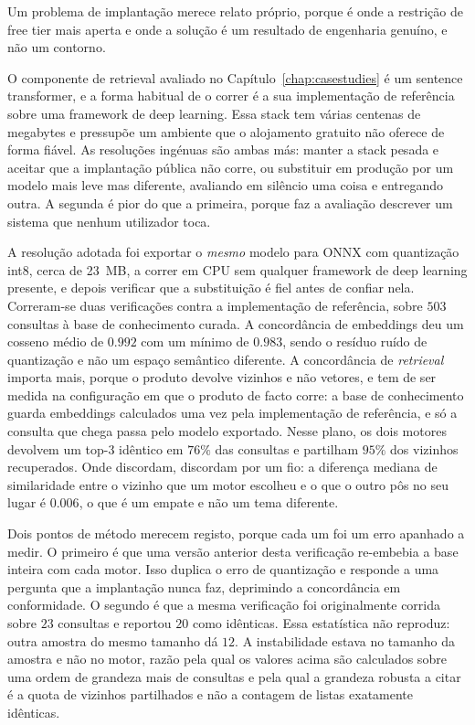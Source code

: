 Um problema de implantação merece relato próprio, porque é onde a restrição de free tier mais aperta e
onde a solução é um resultado de engenharia genuíno, e não um contorno.

O componente de retrieval avaliado no Capítulo~\ref{chap:casestudies} é um sentence transformer, e a
forma habitual de o correr é a sua implementação de referência sobre uma framework de deep learning. Essa stack tem
várias centenas de megabytes e pressupõe um ambiente que o alojamento gratuito não oferece de forma
fiável. As resoluções ingénuas são ambas más: manter a stack pesada e aceitar que a implantação pública
não corre, ou substituir em produção por um modelo mais leve mas diferente, avaliando em silêncio uma
coisa e entregando outra. A segunda é pior do que a primeira, porque faz a avaliação descrever um
sistema que nenhum utilizador toca.

A resolução adotada foi exportar o \emph{mesmo} modelo para ONNX com quantização int8, cerca de 23~MB, a
correr em CPU sem qualquer framework de deep learning presente, e depois verificar que a substituição é
fiel antes de confiar nela. Correram-se duas verificações contra a implementação de referência, sobre
$503$ consultas à base de conhecimento curada. A
concordância de embeddings deu um cosseno médio de $0.992$ com um mínimo de
$0.983$, sendo o resíduo ruído de quantização e não um espaço semântico diferente. A concordância de
\emph{retrieval} importa mais, porque o produto devolve vizinhos e não vetores, e tem de ser medida na
configuração em que o produto de facto corre: a base de conhecimento guarda embeddings calculados uma
vez pela implementação de referência, e só a consulta que chega passa pelo modelo exportado. Nesse
plano, os dois motores devolvem um top-3 idêntico em $76\%$ das consultas e partilham $95\%$ dos
vizinhos recuperados. Onde discordam, discordam por um fio: a diferença mediana de similaridade entre o
vizinho que um motor escolheu e o que o outro pôs no seu lugar é $0.006$, o que é um empate e não um
tema diferente.

Dois pontos de método merecem registo, porque cada um foi um erro apanhado a medir. O primeiro é que
uma versão anterior desta verificação re-embebia a base inteira com cada motor. Isso duplica o erro de
quantização e responde a uma pergunta que a implantação nunca faz, deprimindo a concordância em
conformidade. O segundo é que a mesma verificação foi originalmente corrida sobre $23$ consultas e
reportou $20$ como idênticas. Essa estatística não reproduz: outra amostra do mesmo tamanho dá $12$. A
instabilidade estava no tamanho da amostra e não no motor, razão pela qual os valores acima são
calculados sobre uma ordem de grandeza mais de consultas e pela qual a grandeza robusta a citar é a
quota de vizinhos partilhados e não a contagem de listas exatamente idênticas.

